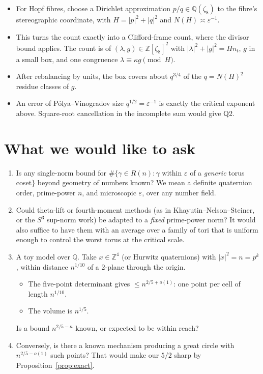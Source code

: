 \documentclass[11pt]{amsart}
\theoremstyle{remark}
\newcommand{\Z}{\mathbb Z}
\newcommand{\Q}{\mathbb Q}
\begin{document}
\begin{enumerate}
  \begin{itemize}
  \item For Hopf fibres, choose a Dirichlet approximation $p/q\in\Q(\zeta_8)$ to the fibre's stereographic coordinate, with $H=|p|^2+|q|^2$ and $N(H)\asymp\varepsilon^{-1}$.
  \item This turns the count exactly into a Clifford-frame count, where the divisor bound applies. The count is of $(\lambda,g)\in\Z[\zeta_8]^2$ with $|\lambda|^2+|g|^2=Hn_t$, $g$ in a small box, and one congruence $\lambda\equiv\kappa g\pmod H$.
  \item After rebalancing by units, the box covers about $q^{3/4}$ of the $q=N(H)^2$ residue classes of $g$.
  \item An error of P\'olya--Vinogradov size $q^{1/2}=\varepsilon^{-1}$ is exactly the critical exponent above. Square-root cancellation in the incomplete sum would give Q2.
  \end{itemize}
\end{enumerate}

\section{What we would like to ask}
\begin{enumerate}
\item[(a)] Is any single-norm bound for $\#\{\gamma\in R(n):\gamma$ within $\varepsilon$ of a \emph{generic} torus coset$\}$ beyond geometry of numbers known? We mean a definite quaternion order, prime-power $n$, and microscopic $\varepsilon$, over any number field.
\item[(b)] Could theta-lift or fourth-moment methods (as in Khayutin--Nelson--Steiner, or the $S^3$ sup-norm work) be adapted to a \emph{fixed} prime-power norm? It would also suffice to have them with an average over a family of tori that is uniform enough to control the worst torus at the critical scale.
\item[(c)] A toy model over $\Q$. Take $x\in\Z^4$ (or Hurwitz quaternions) with $|x|^2=n=p^k$, within distance $n^{1/10}$ of a $2$-plane through the origin.
  \begin{itemize}
  \item The five-point determinant gives $\le n^{2/5+o(1)}$: one point per cell of length $n^{1/10}$.
  \item The volume is $n^{1/5}$.
  \end{itemize}
  Is a bound $n^{2/5-\kappa}$ known, or expected to be within reach?
\item[(d)] Conversely, is there a known mechanism producing a great circle with $n^{2/5-o(1)}$ such points? That would make our $5/2$ sharp by Proposition~\ref{prop:exact}.
\end{enumerate}
\end{document}
